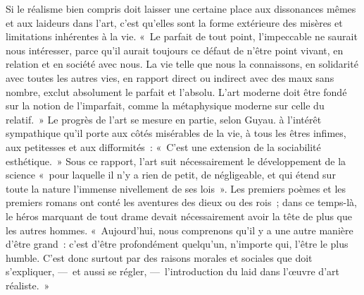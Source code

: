\documentclass[french,twoside]{book} %
\begin{document}
Si le réalisme bien compris doit laisser une certaine place aux dissonances mêmes et aux laideurs dans l’art, c’est qu’elles sont la forme extérieure des misères et limitations inhérentes à la vie. « Le parfait de tout point, l’impeccable ne saurait nous intéresser, parce qu’il aurait toujours ce défaut de n’être point vivant, en relation et en société avec nous. La vie telle que nous la connaissons, en solidarité avec toutes les autres vies, en rapport direct ou indirect avec des maux sans nombre, exclut absolument le parfait et l’absolu. L’art moderne doit être fondé sur la notion de l’imparfait, comme la métaphysique moderne sur celle du relatif. » Le progrès de l’art se mesure en partie, selon Guyau. à l’intérêt sympathique qu’il porte aux côtés misérables de la vie, à tous les êtres infimes, aux petitesses et aux difformités : « C’est une extension de la sociabilité esthétique. » Sous ce rapport, l’art suit nécessairement le développement de la science « pour laquelle il n’y a rien de petit, de négligeable, et qui étend sur toute la nature l’immense nivellement de ses lois ». Les premiers poèmes et les premiers romans ont conté les aventures des dieux ou des rois ; dans ce temps-là, le héros marquant de tout drame devait nécessairement avoir la tête de plus que les autres hommes. « Aujourd’hui, nous comprenons qu’il y a une autre manière d’être grand : c’est d’être profondément quelqu’un, n’importe qui, l’être le plus humble. C’est donc surtout par des raisons morales et sociales que doit s’expliquer, — et aussi se régler, — l’introduction du laid dans l’œuvre d’art réaliste. »\par
\end{document}

